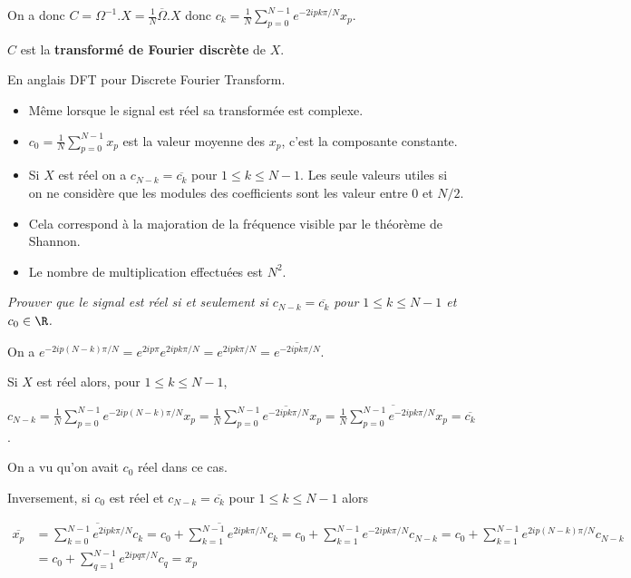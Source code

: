 On a donc $C=\Omega^{-1}.X= \frac 1N \overline \Omega.X$ donc $\displaystyle c_k=\frac 1N\sum_{p=0}^{N-1} e^{-2ipk\pi/N}x_p$.

$C$ est la {\bf transformé de Fourier discrète} de $X$.

En anglais DFT pour Discrete Fourier Transform.

\medskip

\begin{itemize}
\item Même lorsque le signal est réel sa transformée est complexe.

\item $\displaystyle c_0= \frac 1N\sum_{p=0}^{N-1} x_p$ est la valeur moyenne des $x_p$, c'est la composante constante.

\item Si $X$ est réel on a $c_{N-k} = \overline{c_k}$ pour $1\le k \le N-1$. Les seule valeurs utiles si on ne considère que les modules des coefficients sont les valeur entre 0 et $N/2$.

\item Cela correspond à la majoration de la fréquence visible  par le théorème de Shannon.

\item Le nombre de multiplication effectuées est $N^2$.
\end{itemize}
\begin{Exercise}\it 
Prouver que le signal est réel si et seulement si $c_{N-k} = \overline{c_k}$ pour $1\le k \le N-1$ et $c_0\in \R$.
\end{Exercise}
\begin{Answer} 
On a $e^{-2ip(N-k)\pi/N}= e^{2ip\pi}e^{2ipk\pi/N}=e^{2ipk\pi/N}=\overline{e^{-2ipk\pi/N}}$.

Si $X$ est réel alors, pour $1\le k \le N-1$,

$\displaystyle c_{N-k}=\frac 1N\sum_{p=0}^{N-1} e^{-2ip(N-k)\pi/N}x_p
=\frac 1N\sum_{p=0}^{N-1} \overline{e^{-2ipk\pi/N}}x_p
=\overline{\frac 1N\sum_{p=0}^{N-1} e^{-2ipk\pi/N}x_p}=\overline{c_k}$.

On a vu qu'on avait $c_0$ réel dans ce cas.

\medskip

Inversement, si $c_0$ est réel et $c_{N-k}=\overline{c_k}$ pour $1\le k\le N-1$ alors

\begin{align*}
\overline{x_p}
& = \overline{\sum_{k=0}^{N-1} e^{2ipk\pi/N}c_k}
= \overline{c_0+\sum_{k=1}^{N-1} e^{2ipk\pi/N}c_k}
=c_0+\sum_{k=1}^{N-1} e^{-2ipk\pi/N}c_{N-k}
=c_0+\sum_{k=1}^{N-1} e^{2ip(N-k)\pi/N}c_{N-k}\\
&=c_0+\sum_{q=1}^{N-1} e^{2ipq\pi/N}c_q
=x_p
\end{align*}
\end{Answer}
